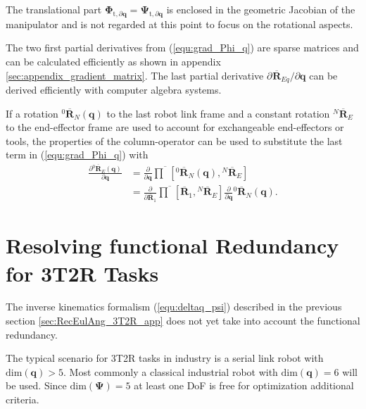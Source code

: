 \documentclass[twocolumn,10pt]{IFTOMM}
\newcommand{\bm}[1]{\boldsymbol{#1}}
\newcommand{\rotmato}[2]{{{ }^{#1}\boldsymbol{\overline{R}}}_{#2}}
\begin{document}
The translational part $\bm{\Phi}_{\mathrm{t},\partial\bm{q}}=\bm{\Psi}_{\mathrm{t},\partial\bm{q}}$ is enclosed in the geometric Jacobian of the manipulator and is not regarded at this point to focus on the rotational aspects.

The two first partial derivatives from (\ref{equ:grad_Phi_q}) are sparse matrices and can be calculated efficiently as shown in appendix \ref{sec:appendix_gradient_matrix}.
The last partial derivative $\partial \rotmato{}{Eq}/\partial \bm{q}$ can be derived efficiently with computer algebra systems.

If a rotation $\rotmato{0}{N}(\bm{q})$ to the last robot link frame and a constant rotation $\rotmato{N}{E}$ to the end-effector frame are used to account for exchangeable end-effectors or tools, the properties of the column-operator can be used to substitute the last term in (\ref{equ:grad_Phi_q}) with
%
\begin{align}
\frac{\partial \rotmato{0}{E}(\bm{q})}{\partial \bm{q}} 
&=
\frac{\partial}{\partial \bm{q}} \overline{\prod}\left[ \rotmato{0}{N}(\bm{q}), \rotmato{N}{E}\right] \nonumber \\
&=
\frac{\partial}{\partial \overline{\bm{R}}_1} \overline{\prod}\left[ \overline{\bm{R}}_1, \rotmato{N}{E}\right]
\frac{\partial}{\partial \bm{q}} \rotmato{0}{N}(\bm{q}).
\label{equ:ee_rotation_gradq}
\end{align}

\section{Resolving functional Redundancy for 3T2R Tasks}
\label{sec:ResFuncRed}


The inverse kinematics formalism (\ref{equ:deltaq_psi}) described in the previous section \ref{sec:RecEulAng_3T2R_app} does not yet take into account the functional redundancy.

The typical scenario for 3T2R tasks in industry is a serial link robot with $\mathrm{dim}(\bm{q})>5$.
Most commonly a classical industrial robot with $\mathrm{dim}(\bm{q})=6$ will be used.
Since $\mathrm{dim}(\bm{\Psi})=5$ at least one DoF is free for optimization additional criteria.
\end{document}
